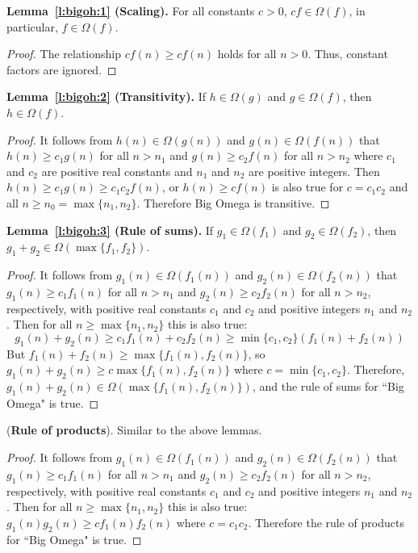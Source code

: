 \noindent\textbf{Lemma~\ref{l:bigoh:1} (Scaling).} For all constants $c > 0$, $cf\in\Omega(f)$,
in particular, $f\in\Omega(f)$.
\begin{proof}
The relationship \(cf(n) \geq cf(n)\) holds for all \(n > 0\). 
Thus, constant factors are ignored.
\end{proof}
\noindent\textbf{Lemma~\ref{l:bigoh:2} (Transitivity).}
If $h\in\Omega(g)$ and $g\in\Omega(f)$, then $h\in\Omega(f)$.
\begin{proof}
It follows from $h(n) \in \Omega(g(n))$ and 
$g(n) \in \Omega(f(n))$ that $h(n) \geq c_1g(n)$ for all $n > n_1$ and
$g(n) \geq c_2f(n)$ for all $n > n_2$ where $c_1$ and $c_2$ are 
positive real constants and
$n_1$ and $n_2$ are positive integers. 
Then $h(n) \geq c_1g(n) \geq c_1 c_2 f (n)$,
or $h(n) \geq cf(n)$ is also true
for $c = c_1c_2$ and all $n \geq n_0 = \max\{n_1,n_2\}$. 
Therefore Big Omega is transitive.
\end{proof}
\noindent\textbf{Lemma~\ref{l:bigoh:3} (Rule of sums).}
If $g_1\in\Omega(f_1)$ and $g_2\in\Omega(f_2)$, then 
$g_1 + g_2\in\Omega(\max\{f_1,f_2\})$.
\begin{proof}
It follows from $g_1(n) \in \Omega(f_1(n))$ and $g_2(n) \in \Omega(f_2(n))$ that 
$g_1(n) \geq c_1f_1(n)$ for all $n > n_1$ and
$g_2(n) \geq c_2f_2(n)$ for all $n > n_2$, respectively, with 
positive real constants  $c_1$ and $c_2$ and positive integers
$n_1$ and $n_2$. Then for all $n \geq \max\{n_1,n_2\}$ 
this is also true: 
\[
g_1(n) + g_2(n) \geq c_1f_1(n)  + c_2f_2(n) \geq \min\{c_1,c_2\}\left(f_1(n)+f_2(n)\right)
\] 
But 
$f_1(n)+f_2(n)\geq \max\{f_1(n),f_2(n)\}$, so 
$g_1(n)+g_2(n)\geq c\max\{f_1(n),f_2(n)\}$ where $c = \min\{c_1,c_2\}$.
Therefore, $g_1(n)+g_2(n) \in \Omega(\max\{f_1(n),f_2(n)\})$, and  the rule of sums 
for ``Big Omega" is true.
\end{proof}
  (\textbf{Rule of products}).
Similar to the above lemmas.

\begin{proof}
It follows from $g_1(n) \in \Omega(f_1(n))$ and $g_2(n) \in \Omega(f_2(n))$ that 
$g_1(n) \geq c_1f_1(n)$ for all $n > n_1$ and
$g_2(n) \geq c_2f_2(n)$ for all $n > n_2$, respectively, with 
positive real constants $c_1$ and $c_2$ and positive integers
$n_1$ and $n_2$. Then for all $n \geq \max\{n_1,n_2\}$ 
this is also true: $g_1(n)g_2(n) \geq %
cf_1(n)f_2(n)$ where $c=c_1c_2$. 
Therefore the rule of products for ``Big Omega" is true.
\end{proof}
\fi

